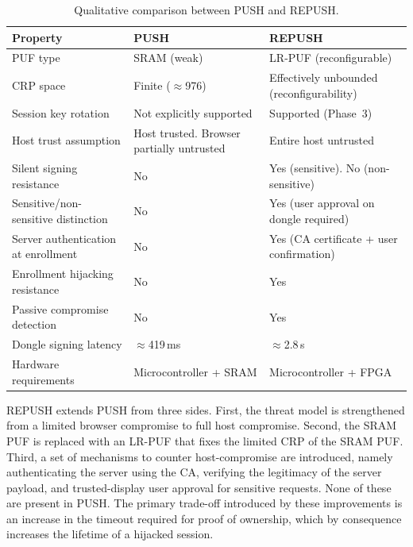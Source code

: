 \begin{table}[ht!]
\centering
\caption{Qualitative comparison between PUSH and REPUSH.}
\begin{tabular}{l>{\raggedright\arraybackslash}p{4cm}>{\raggedright\arraybackslash}p{4cm}}
\toprule
\textbf{Property}                      & \textbf{PUSH}                  & \textbf{REPUSH} \\
\midrule
PUF type                               & SRAM (weak)                    & LR-PUF (reconfigurable) \\
CRP space                              & Finite ($\approx$976)          & Effectively unbounded (reconfigurability) \\
Session key rotation                   & Not explicitly supported                  & Supported (Phase~3) \\
Host trust assumption                  & Host trusted. Browser partially untrusted                & Entire host untrusted \\
Silent signing resistance              & No                             & Yes (sensitive). No (non-sensitive) \\
Sensitive/non-sensitive distinction    & No                             & Yes (user approval on dongle required) \\
Server authentication at enrollment     & No                             & Yes (CA certificate + user confirmation) \\
Enrollment hijacking resistance         & No                             & Yes \\
Passive compromise detection           & No                             & Yes \\
Dongle signing latency         & $\approx$419\,ms               & $\approx$2.8\,s \\
Hardware requirements          & Microcontroller + SRAM         & Microcontroller + FPGA \\
\hline
\end{tabular}
\label{tab:push-repush-summary}
\end{table}

REPUSH extends PUSH from three sides. First, the threat model is strengthened from a limited browser compromise to full host compromise. Second, the SRAM PUF is replaced with an LR-PUF that fixes the limited CRP of the SRAM PUF. Third, a set of mechanisms to counter host-compromise are introduced, namely authenticating the server using the CA, verifying the legitimacy of the server payload, and trusted-display user approval for sensitive requests. None of these are present in PUSH. The primary trade-off introduced by these improvements is an increase in the timeout required for proof of ownership, which by consequence increases the lifetime of a hijacked session.


